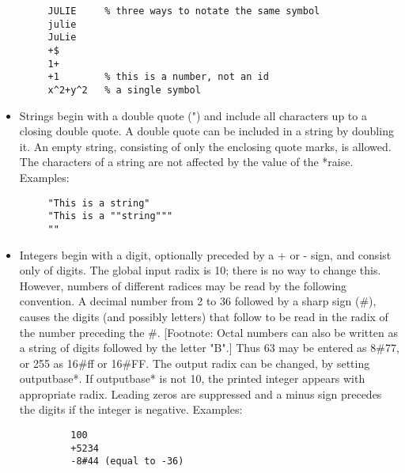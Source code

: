 \begin{itemize}
\begin{verbatim}
     JULIE     % three ways to notate the same symbol
     julie
     JuLie
     +$
     1+
     +1        % this is a number, not an id
     x^2+y^2   % a single symbol
\end{verbatim}
\item Strings begin with a  double  quote  (")  and  include  all
     characters  up to a closing  double quote.  A  double quote
     can  be included in  a string by  doubling it.    An  empty
     string,  consisting    of only the  enclosing quote  marks,
     is allowed.   The characters  of  a string are not affected
     by the value of the *raise.  Examples:
\begin{verbatim}
     "This is a string"
     "This is a ""string"""
     ""
\end{verbatim}
\item Integers begin with a digit, optionally preceded by a +  or
     - sign, and consist only of digits.  The global input radix
     is 10; there is no way to change this.  However, numbers of
     different  radices may be read by the following convention.
     A decimal number from 2 to 36 followed by a sharp sign (\#),
     causes the digits (and possibly letters) that follow to  be
     read in the radix of the number preceding the \#. [Footnote:
     Octal  numbers  can  also  be written as a string of digits
     followed by the letter "B".] Thus  63  may  be  entered  as
     8\#77,  or  255  as 16\#ff or 16\#FF.  The output radix can be
     changed, by setting outputbase*.  If outputbase* is not 10,
     the  printed  integer  appears  with   appropriate   radix.
     Leading  zeros are suppressed and a minus sign precedes the
     digits if the integer is negative.  Examples:
\begin{verbatim}
         100
         +5234
         -8#44 (equal to -36)
\end{verbatim}


\end{itemize}
